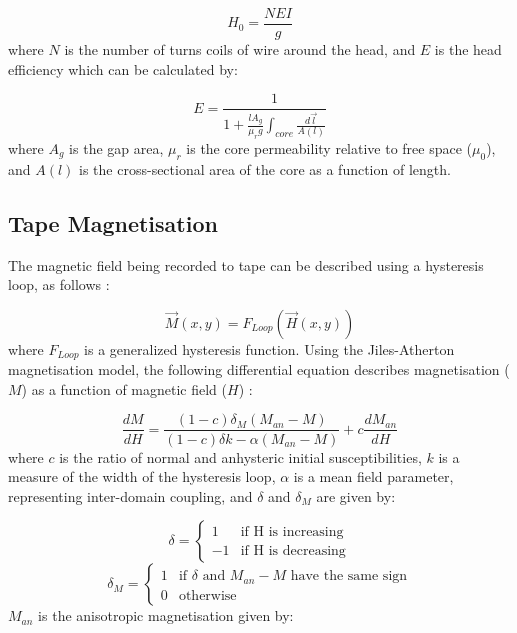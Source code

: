 \documentclass[twoside,a4paper]{article}
\begin{document}
\begin{equation}
    H_0 = \frac{NEI}{g}
\end{equation}
%
where $N$ is the number of turns coils of wire around the head, and $E$ is the head 
efficiency which can be calculated by:

\begin{equation}
    E = \frac{1}{1 + \frac{l  A_g}{\mu_r g} \int_{core} \frac {d \vec{l}}{A(l)}}
\end{equation}
%
where $A_g$ is the gap area, $\mu_r$ is the core permeability relative to 
free space ($\mu_0$), and $A(l)$ is the cross-sectional 
area of the core as a function of length.

\subsection{Tape Magnetisation}
The magnetic field being recorded to tape can be described using 
a hysteresis loop, as follows \cite{1994tmr..book.....B}:

\begin{equation}
    \vec{M}(x,y) = F_{Loop}(\vec{H}(x,y))
\end{equation}
%
where $F_{Loop}$ is a generalized hysteresis function.
\newline\newline
Using the Jiles-Atherton magnetisation model, the following
differential equation describes magnetisation ($M$) as a function 
of magnetic field ($H$) \cite{Hysteresis}:

\begin{equation}
    \frac{dM}{dH} = \frac{(1-c) \delta_M (M_{an} - M)}{(1-c) \delta k - \alpha (M_{an} - M)} + c \frac{dM_{an}}{dH}
    \label{eq5}
\end{equation}
%
where $c$ is the ratio of normal and anhysteric initial susceptibilities,
$k$ is a measure of the width of the hysteresis
loop, $\alpha$ is a mean field parameter, representing inter-domain
coupling, and $\delta$ and $\delta_M$ are given by:

\begin{equation}
    \delta = \begin{cases}
        1 & \text{if H is increasing} \\
        -1 & \text{if H is decreasing}
    \end{cases}
\end{equation}
\begin{equation}
    \delta_M = \begin{cases}
        1 & \text{if $\delta$ and $M_{an} - M$ have the same sign} \\
        0 & \text{otherwise}
    \end{cases}
\end{equation}
%
$M_{an}$ is the anisotropic magnetisation given by:
\end{document}
